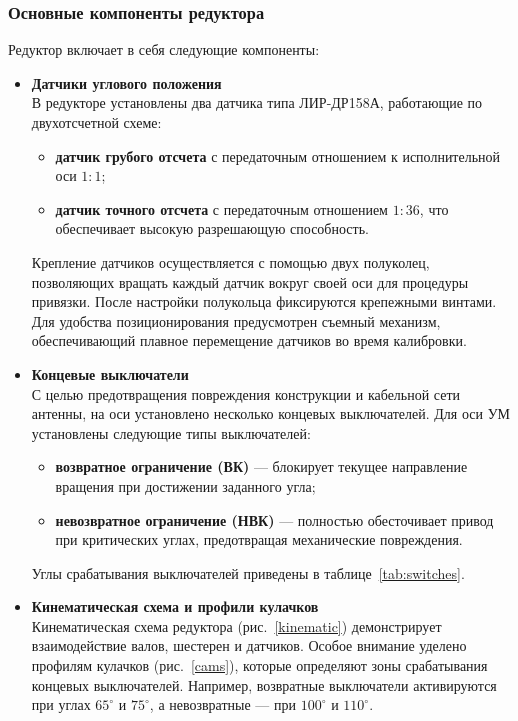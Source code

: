\subsubsection{Основные компоненты редуктора}
Редуктор включает в себя следующие компоненты:
\begin{itemize}
    \item \textbf{Датчики углового положения} \\
    В редукторе установлены два датчика типа ЛИР-ДР158А, работающие по двухотсчетной схеме:
    \begin{itemize}
        \item \textbf{датчик грубого отсчета} с передаточным отношением к исполнительной оси \(1:1\);
        \item \textbf{датчик точного отсчета} с передаточным отношением \(1:36\), что обеспечивает высокую разрешающую способность.
    \end{itemize}
    Крепление датчиков осуществляется с помощью двух полуколец, позволяющих вращать каждый датчик вокруг своей оси для процедуры привязки. %
    После настройки полукольца фиксируются крепежными винтами. Для удобства позиционирования предусмотрен съемный механизм, 
    обеспечивающий плавное перемещение датчиков во время калибровки.

    \item \textbf{Концевые выключатели} \\
    С целью предотвращения повреждения конструкции и кабельной сети антенны, на оси установлено несколько концевых выключателей. 
    Для оси УМ установлены следующие типы выключателей:
    \begin{itemize}
        \item \textbf{возвратное ограничение (ВК)} — блокирует текущее направление вращения при достижении заданного угла;
        \item \textbf{невозвратное ограничение (НВК)} — полностью обесточивает привод при критических углах, предотвращая механические повреждения.
    \end{itemize}
    Углы срабатывания выключателей приведены в таблице~\ref{tab:switches}.

    \item \textbf{Кинематическая схема и профили кулачков} \\
    Кинематическая схема редуктора (рис.~\ref{kinematic}) демонстрирует взаимодействие валов, шестерен и датчиков. Особое внимание уделено профилям кулачков (рис.~\ref{cams}), 
    которые определяют зоны срабатывания концевых выключателей. 
    Например, возвратные выключатели активируются при углах \(65^\circ\) и \(75^\circ\), а невозвратные — при \(100^\circ\) и \(110^\circ\).
\end{itemize}

